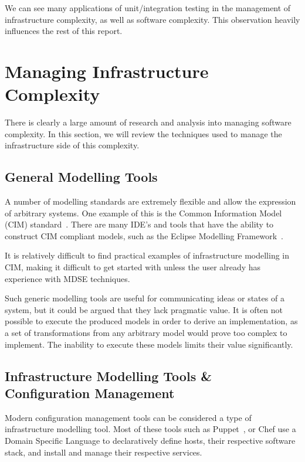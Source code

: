 \documentclass{cshonours}
\begin{document}
We can see many applications of unit/integration testing in the management of infrastructure complexity, as well as software complexity. This observation heavily influences the rest of this report.

\section{Managing Infrastructure Complexity}

There is clearly a large amount of research and analysis into managing software complexity. In this section, we will review the techniques used to manage the infrastructure side of this complexity.

\subsection{General Modelling Tools}

A number of modelling standards are extremely flexible and allow the expression of arbitrary systems. One example of this is the Common Information Model (CIM) standard~\cite{CIM}. There are many IDE’s and tools that have the ability to construct CIM compliant models, such as the Eclipse Modelling Framework~\cite{EMF}.

It is relatively difficult to find practical examples of infrastructure modelling in CIM, making it difficult to get started with unless the user already has experience with MDSE techniques.

Such generic modelling tools are useful for communicating ideas or states of a system, but it could be argued that they lack pragmatic value. It is often not possible to execute the produced models in order to derive an implementation, as a set of transformations from any arbitrary model would prove too complex to implement. The inability to execute these models limits their value significantly.

\subsection{Infrastructure Modelling Tools \& Configuration Management}

Modern configuration management tools can be considered a type of infrastructure modelling tool. Most of these tools such as Puppet~\cite{Puppet}, or Chef\cite{Chef} use a Domain Specific Language to declaratively define hosts, their respective software stack, and install and manage their respective services.
\end{document}
